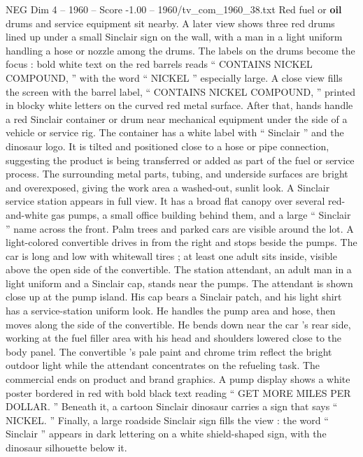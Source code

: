 \begin{textsample}{NEG Dim 4 – 1960 – Score -1.00 – 1960/tv\_com\_1960\_38.txt}
Red fuel or \textbf{oil} drums and service equipment sit nearby.
A later view shows three red drums lined up under a small Sinclair sign on the wall, with a man in a light uniform handling a hose or nozzle among the drums.
The labels on the drums become the focus : bold white text on the red barrels reads “ CONTAINS NICKEL COMPOUND, ” with the word “ NICKEL ” especially large.
A close view fills the screen with the barrel label, “ CONTAINS NICKEL COMPOUND, ” printed in blocky white letters on the curved red metal surface.
After that, hands handle a red Sinclair container or drum near mechanical equipment under the side of a vehicle or service rig.
The container has a white label with “ Sinclair ” and the dinosaur logo.
It is tilted and positioned close to a hose or pipe connection, suggesting the product is being transferred or added as part of the fuel or service process.
The surrounding metal parts, tubing, and underside surfaces are bright and overexposed, giving the work area a washed-out, sunlit look.
A Sinclair service station appears in full view.
It has a broad flat canopy over several red-and-white gas pumps, a small office building behind them, and a large “ Sinclair ” name across the front.
Palm trees and parked cars are visible around the lot.
A light-colored convertible drives in from the right and stops beside the pumps.
The car is long and low with whitewall tires ; at least one adult sits inside, visible above the open side of the convertible.
The station attendant, an adult man in a light uniform and a Sinclair cap, stands near the pumps.
The attendant is shown close up at the pump island.
His cap bears a Sinclair patch, and his light shirt has a service-station uniform look.
He handles the pump area and hose, then moves along the side of the convertible.
He bends down near the car ’s rear side, working at the fuel filler area with his head and shoulders lowered close to the body panel.
The convertible ’s pale paint and chrome trim reflect the bright outdoor light while the attendant concentrates on the refueling task.
The commercial ends on product and brand graphics.
A pump display shows a white poster bordered in red with bold black text reading “ GET MORE MILES PER DOLLAR. ” Beneath it, a cartoon Sinclair dinosaur carries a sign that says “ NICKEL. ” Finally, a large roadside Sinclair sign fills the view : the word “ Sinclair ” appears in dark lettering on a white shield-shaped sign, with the dinosaur silhouette below it.

\end{textsample}
